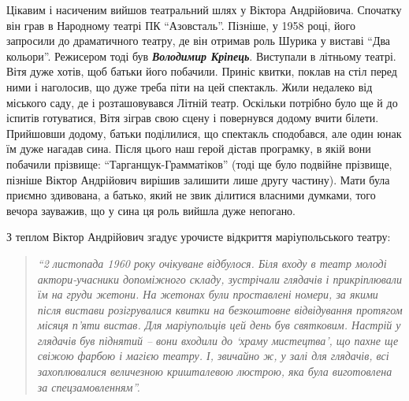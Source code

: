 Цікавим і насиченим вийшов театральний шлях у Віктора Андрійовича.  Спочатку
він грав в Народному театрі ПК \enquote{Азовсталь}. Пізніше, у 1958 році,  його
запросили до драматичного театру, де він отримав роль Шурика у виставі \enquote{Два
кольори}. Режисером тоді був \emph{\textbf{Володимир Кріпець}}. Виступали в літньому театрі.
Вітя дуже хотів, щоб батьки його побачили. Приніс квитки, поклав на стіл перед
ними і наголосив, що дуже треба піти на цей спектакль. Жили недалеко від
міського саду, де і розташовувався Літній театр. Оскільки потрібно було ще й до
іспитів готуватися, Вітя зіграв свою сцену і повернувся додому вчити білети.
Прийшовши додому, батьки поділилися, що спектакль сподобався, але один юнак їм
дуже нагадав сина. Після цього наш герой дістав програмку, в якій вони побачили
прізвище: \enquote{Тарганщук-Грамматіков} (тоді ще було подвійне прізвище, пізніше
Віктор Андрійович вирішив залишити лише другу частину). Мати була приємно
здивована, а батько, який не звик ділитися власними думками, того вечора
зауважив, що у сина ця роль вийшла дуже непогано.

З теплом Віктор Андрійович згадує урочисте відкриття маріупольського театру: 

\begin{quote}
\em\enquote{2 листопада 1960 року очікуване відбулося.  Біля входу в театр молоді
актори-учасники допоміжного складу, зустрічали глядачів і прикріплювали їм на
груди жетони. На жетонах були проставлені номери, за якими після вистави
розігрувалися квитки на безкоштовне відвідування протягом місяця п'яти вистав.
Для маріупольців цей день був святковим. Настрій у глядачів був піднятий – вони
входили до \enquote{храму мистецтва}, що пахне ще свіжою фарбою і магією театру. І,
звичайно ж, у залі для глядачів, всі захоплювалися величезною кришталевою
люстрою, яка була виготовлена за спецзамовленням}.
\end{quote}


